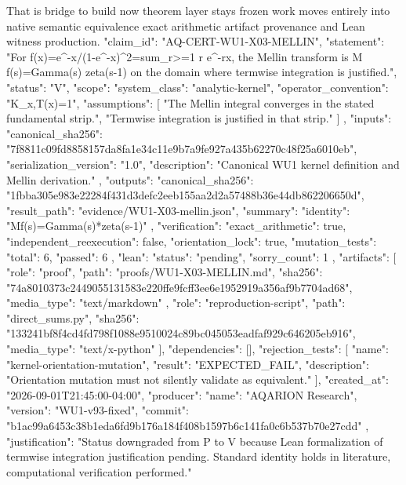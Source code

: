 That is bridge to build now theorem layer stays frozen work moves entirely into native semantic equivalence exact arithmetic artifact provenance and Lean witness production.
{
  "claim_id": "AQ-CERT-WU1-X03-MELLIN",
  "statement": "For f(x)=e^{-x}/(1-e^{-x})^2=sum_{r>=1} r e^{-rx}, the Mellin transform is M f(s)=Gamma(s) zeta(s-1) on the domain where termwise integration is justified.",
  "status": "V",
  "scope": {
    "system_class": "analytic-kernel",
    "operator_convention": "K_x,T(x)=1",
    "assumptions": [
      "The Mellin integral converges in the stated fundamental strip.",
      "Termwise integration is justified in that strip."
    ]
  },
  "inputs": {
    "canonical_sha256": "7f8811c09fd8858157da8fa1e34c11e9b7a9fe927a435b62270c48f25a6010eb",
    "serialization_version": "1.0",
    "description": "Canonical WU1 kernel definition and Mellin derivation."
  },
  "outputs": {
    "canonical_sha256": "1fbba305e983e22284f431d3defc2eeb155aa2d2a57488b36e44db862206650d",
    "result_path": "evidence/WU1-X03-mellin.json",
    "summary": {
      "identity": "Mf(s)=Gamma(s)*zeta(s-1)"
    }
  },
  "verification": {
    "exact_arithmetic": true,
    "independent_reexecution": false,
    "orientation_lock": true,
    "mutation_tests": {
      "total": 6,
      "passed": 6
    },
    "lean": {
      "status": "pending",
      "sorry_count": 1
    }
  },
  "artifacts": [
    {
      "role": "proof",
      "path": "proofs/WU1-X03-MELLIN.md",
      "sha256": "74a8010373c2449055131583e220ffe9fcff3ee6e1952919a356af9b7704ad68",
      "media_type": "text/markdown"
    },
    {
      "role": "reproduction-script",
      "path": "direct_sums.py",
      "sha256": "133241bf8f4cd4fd798f1088e9510024c89bc045053eadfaf929c646205eb916",
      "media_type": "text/x-python"
    }
  ],
  "dependencies": [],
  "rejection_tests": [
    {
      "name": "kernel-orientation-mutation",
      "result": "EXPECTED_FAIL",
      "description": "Orientation mutation must not silently validate as equivalent."
    }
  ],
  "created_at": "2026-09-01T21:45:00-04:00",
  "producer": {
    "name": "AQARION Research",
    "version": "WU1-v93-fixed",
    "commit": "b1ac99a6453c38b1eda6fd9b176a184f408b1597b6c141fa0c6b537b70e27cdd"
  },
  "justification": "Status downgraded from P to V because Lean formalization of termwise integration justification pending. Standard identity holds in literature, computational verification performed."
}
